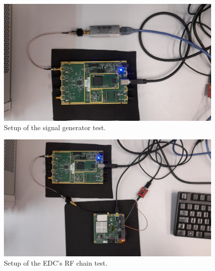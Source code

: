 \begin{figure}[!ht]
    \begin{center}
        \includegraphics[width=\textwidth]{figures/edc_report/edc-stimulus-test}
        \caption{Setup of the signal generator test.}
        \label{fig:edc-stimulus-test}
    \end{center}
\end{figure}

\begin{figure}[!ht]
    \begin{center}
        \includegraphics[width=\textwidth]{figures/edc_report/rf-chain-setup}
        \caption{Setup of the EDC's RF chain test.}
        \label{fig:edc-rf-chain-test-setup}
    \end{center}
\end{figure}

